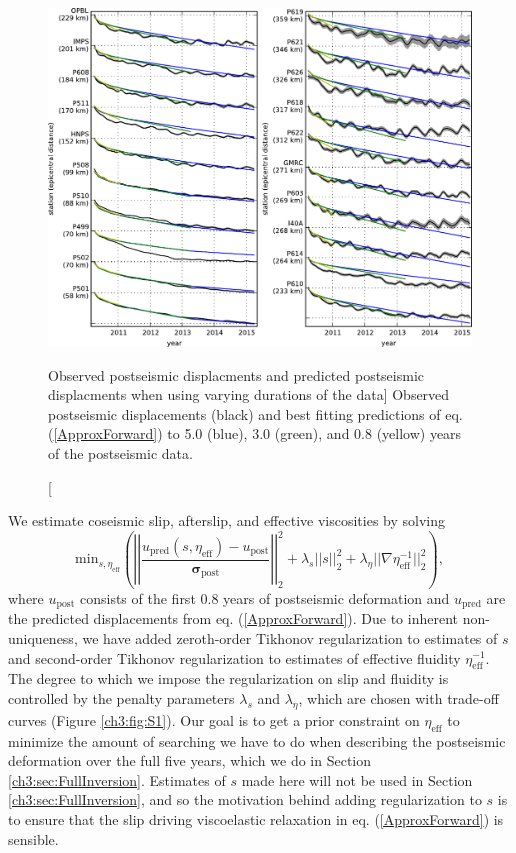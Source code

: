 \begin{figure}
\includegraphics[scale=0.9]{ch3/figures/2016jb013114-p10}
\caption
[Observed postseismic displacments and predicted postseismic
displacments when using varying durations of the data]
{Observed postseismic displacements (black) and best fitting
predictions of eq. (\ref{ApproxForward}) to 5.0 (blue), 3.0 (green),
and 0.8 (yellow) years of the postseismic data.}
\label{ch3:fig:RecordSection1}
\end{figure}

We estimate coseismic slip, afterslip, and effective viscosities by
solving
\begin{equation}\label{ObjectiveFunction}
 \mathrm{min}_{s,\eta_\mathrm{eff}} \left(\left|\left|
 \frac{u_\mathrm{pred}(s,\eta_\mathrm{eff}) - u_\mathrm{post}}
 {\mathbf{\sigma_\mathrm{post}}}\right|\right|_2^2 + 
 \lambda_s||s||_2^2 + 
 \lambda_\eta||\nabla \eta_{\mathrm{eff}}^{-1}||_2^2\right),
\end{equation} 
where $u_\mathrm{post}$ consists of the first 0.8 years of postseismic
deformation and $u_\mathrm{pred}$ are the predicted displacements from
eq. (\ref{ApproxForward}).  Due to inherent non-uniqueness, we have
added zeroth-order Tikhonov regularization to estimates of $s$ and
second-order Tikhonov regularization to estimates of effective
fluidity $\eta_\mathrm{eff}^{-1}$. The degree to which we impose the
regularization on slip and fluidity is controlled by the penalty
parameters $\lambda_s$ and $\lambda_\eta$, which are chosen with
trade-off curves (Figure \ref{ch3:fig:S1}).  Our goal is to get a prior constraint
on $\eta_{\mathrm{eff}}$ to minimize the amount of searching we have
to do when describing the postseismic deformation over the full five
years, which we do in Section \ref{ch3:sec:FullInversion}.  Estimates
of $s$ made here will not be used in Section
\ref{ch3:sec:FullInversion}, and so the motivation behind adding
regularization to $s$ is to ensure that the slip driving viscoelastic
relaxation in eq. (\ref{ApproxForward}) is sensible.

